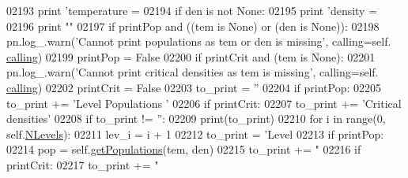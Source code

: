 \begin{DoxyCode}
{{{{02193             \textcolor{keywordflow}{print} \textcolor{stringliteral}{'temperature = %
02194         \textcolor{keywordflow}{if} den \textcolor{keywordflow}{is} \textcolor{keywordflow}{not} \textcolor{keywordtype}{None}:
02195             \textcolor{keywordflow}{print} \textcolor{stringliteral}{'density = %
02196         \textcolor{keywordflow}{print} \textcolor{stringliteral}{""}
02197         \textcolor{keywordflow}{if} printPop \textcolor{keywordflow}{and} ((tem \textcolor{keywordflow}{is} \textcolor{keywordtype}{None}) \textcolor{keywordflow}{or} (den \textcolor{keywordflow}{is} \textcolor{keywordtype}{None})):
02198             pn.log\_.warn(\textcolor{stringliteral}{'Cannot print populations as tem or den is missing'}, calling=self.
      \hyperlink{classpyneb_1_1core_1_1pynebcore_1_1_atom_a373b7735acf4f528b54bddf373ad67a1}{calling})
02199             printPop = \textcolor{keyword}{False}
02200         \textcolor{keywordflow}{if} printCrit \textcolor{keywordflow}{and} (tem \textcolor{keywordflow}{is} \textcolor{keywordtype}{None}):
02201             pn.log\_.warn(\textcolor{stringliteral}{'Cannot print critical densities as tem is missing'}, calling=self.
      \hyperlink{classpyneb_1_1core_1_1pynebcore_1_1_atom_a373b7735acf4f528b54bddf373ad67a1}{calling})
02202             printCrit = \textcolor{keyword}{False}
02203         to\_print = \textcolor{stringliteral}{''}
02204         \textcolor{keywordflow}{if} printPop:
02205             to\_print += \textcolor{stringliteral}{'Level   Populations  '}
02206         \textcolor{keywordflow}{if} printCrit:
02207             to\_print += \textcolor{stringliteral}{'Critical densities'}
02208         \textcolor{keywordflow}{if} to\_print != \textcolor{stringliteral}{''}:
02209             print(to\_print)
02210         \textcolor{keywordflow}{for} i \textcolor{keywordflow}{in} range(0, self.\hyperlink{classpyneb_1_1core_1_1pynebcore_1_1_atom_a6b43c1e6431a6786c1b4267f704fb4e8}{NLevels}):
02211             lev\_i = i + 1
02212             to\_print = \textcolor{stringliteral}{'Level %
02213             \textcolor{keywordflow}{if} printPop:
02214                 pop = self.\hyperlink{classpyneb_1_1core_1_1pynebcore_1_1_atom_aab7496403c8aaef40ab3b20b5c00e9f0}{getPopulations}(tem, den)
02215                 to\_print += \textcolor{stringliteral}{"%
02216             \textcolor{keywordflow}{if} printCrit:
02217                 to\_print += \textcolor{stringliteral}{"%
}}}}}}}}}
\end{DoxyCode}
